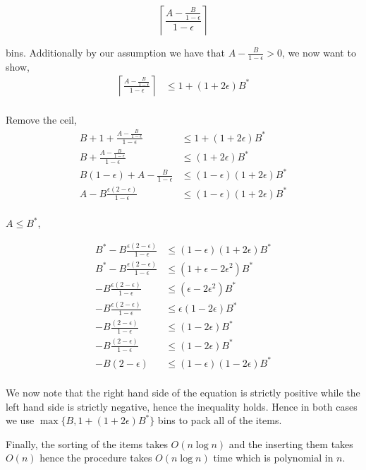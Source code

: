 \documentclass[a4paper]{article}
\begin{document}
$$
\left\lceil\frac{A - \frac{B}{1-\epsilon}}{1-\epsilon}\right\rceil
$$

bins. Additionally by our assumption we have that $A - \frac{B}{1-\epsilon} > 0$, we now want to show,
\begin{align*}
	\left\lceil\frac{A - \frac{B}{1-\epsilon}}{1-\epsilon}\right\rceil &\leq 1+(1+2\epsilon)B^*\\
\end{align*}

Remove the ceil, 
\begin{align*}
	B+1+\frac{A - \frac{B}{1-\epsilon}}{1-\epsilon} &\leq 1+(1+2\epsilon)B^*\\
	B+\frac{A - \frac{B}{1-\epsilon}}{1-\epsilon} &\leq (1+2\epsilon)B^*\\
	 B(1-\epsilon)+A - \frac{B}{1-\epsilon} &\leq (1-\epsilon)(1+2\epsilon)B^*\\
	 A - B\frac{\epsilon(2-\epsilon)}{1-\epsilon} &\leq (1-\epsilon)(1+2\epsilon)B^*\\
\end{align*}

$A \leq B^*$,

\begin{align*}
	B^* - B\frac{\epsilon(2-\epsilon)}{1-\epsilon} &\leq (1-\epsilon)(1+2\epsilon)B^*\\
	 B^* - B\frac{\epsilon(2-\epsilon)}{1-\epsilon} &\leq  (1+ \epsilon -2\epsilon^2)B^*\\
	  -    B\frac{\epsilon(2-\epsilon)}{1-\epsilon} &\leq  (\epsilon -2\epsilon^2)B^*\\
	  -    B\frac{\epsilon(2-\epsilon)}{1-\epsilon} &\leq  \epsilon(1 -2\epsilon)B^*\\
	  -    B\frac{(2-\epsilon)}{1-\epsilon} &\leq   (1 -2\epsilon)B^*\\
	  -    B\frac{(2-\epsilon)}{1-\epsilon} &\leq   (1 -2\epsilon)B^*\\
	  -    B(2-\epsilon) &\leq   (1-\epsilon)(1 -2\epsilon)B^*\\
\end{align*}

We now note that the right hand side of the equation is strictly positive while the 
left hand side is strictly negative, hence the inequality holds. Hence in both cases we 
use $\max\{B, 1+(1+2\epsilon)B^*\}$ bins to pack all of the items.

Finally, the sorting of the items takes $O(n\log n)$ and the inserting them takes $O(n)$ hence 
the procedure takes $O(n \log n)$ time which is polynomial in $n$.
\end{document}
